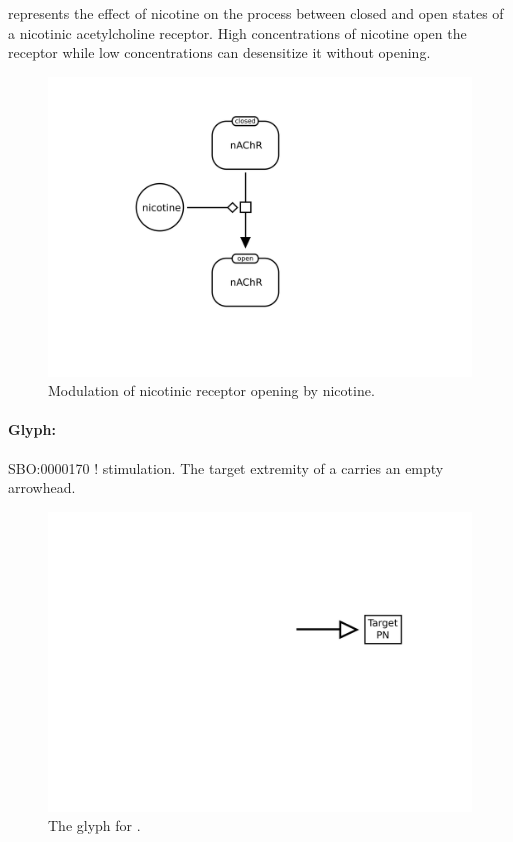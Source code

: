  represents the effect of nicotine on the process between closed and open states of a nicotinic acetylcholine receptor. High concentrations of nicotine open the receptor while low concentrations can desensitize it without opening.

\begin{figure}[htb]
  \centering
  \includegraphics[scale = 0.5]{examples/modulation-nAChR}
  \caption{Modulation of nicotinic receptor opening by nicotine.}
  \label{fig:techref:modul-nico}
\end{figure}


\paragraph{Glyph: }\label{sec:techref:stimulation}


\begin{glyphDescription}
 \glyphSboTerm SBO:0000170 ! stimulation.
 \glyphEndPoint The target extremity of a  carries an empty arrowhead.
 \end{glyphDescription}

\begin{figure}[htb]
  \centering
  \includegraphics[scale = 0.5]{images/stimulation}
  \caption{The \PD glyph for .}
  \label{fig:techref:stimulation}
\end{figure}


